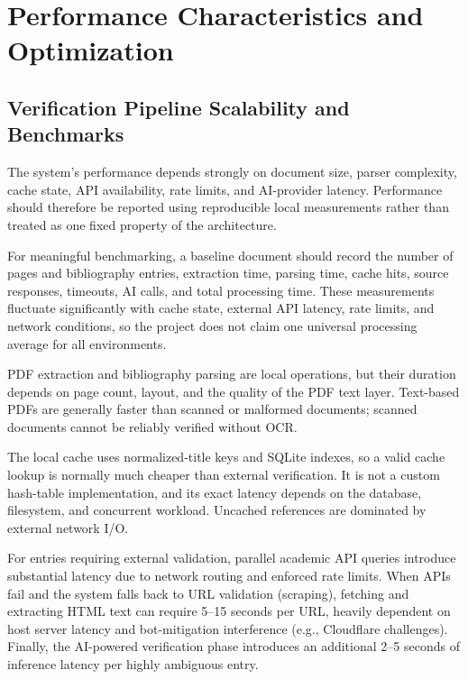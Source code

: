 \documentclass[12pt,a4paper,oneside]{report}
\begin{document}
\chapter{Performance Characteristics and Optimization}

\section{Verification Pipeline Scalability and Benchmarks}

The system's performance depends strongly on document size, parser complexity, cache state, API availability, rate limits, and AI-provider latency. Performance should therefore be reported using reproducible local measurements rather than treated as one fixed property of the architecture.

For meaningful benchmarking, a baseline document should record the number of pages and bibliography entries, extraction time, parsing time, cache hits, source responses, timeouts, AI calls, and total processing time. These measurements fluctuate significantly with cache state, external API latency, rate limits, and network conditions, so the project does not claim one universal processing average for all environments.

PDF extraction and bibliography parsing are local operations, but their duration depends on page count, layout, and the quality of the PDF text layer. Text-based PDFs are generally faster than scanned or malformed documents; scanned documents cannot be reliably verified without OCR.

The local cache uses normalized-title keys and SQLite indexes, so a valid cache lookup is normally much cheaper than external verification. It is not a custom hash-table implementation, and its exact latency depends on the database, filesystem, and concurrent workload. Uncached references are dominated by external network I/O.

For entries requiring external validation, parallel academic API queries introduce substantial latency due to network routing and enforced rate limits. When APIs fail and the system falls back to URL validation (scraping), fetching and extracting HTML text can require 5--15 seconds per URL, heavily dependent on host server latency and bot-mitigation interference (e.g., Cloudflare challenges). Finally, the AI-powered verification phase introduces an additional 2--5 seconds of inference latency per highly ambiguous entry.
\end{document}
